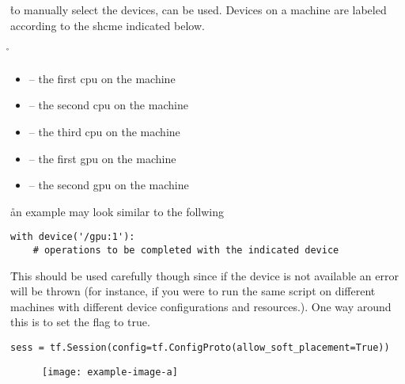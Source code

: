\r{to manually select the devices,  can be used. Devices on a machine are labeled according to the shcme indicated below.}

\r{\begin{itemize}
		\item {} -- the first cpu on the machine
		\item {} -- the second cpu on the machine
		\item {} -- the third cpu on the machine
		\item {} -- the first gpu on the machine
		\item {} -- the second gpu on the machine
\end{itemize}}

\r{an example may look similar to the follwing}

\begin{lstlisting}[style=pyInStyle]
with device('/gpu:1'):
	# operations to be completed with the indicated device
\end{lstlisting}

\r{This should be used carefully though since if the device is not available an error will be thrown (for instance, if you were to run the same script on different machines with different device configurations and resources.).  One way around this is to set the  flag to true.}

\begin{lstlisting}[style=pyInStyle]
sess = tf.Session(config=tf.ConfigProto(allow_soft_placement=True))
\end{lstlisting}



\begin{figure}[htp]
	\centering
	\texttt{[image: example-image-a]}\hfil
	\caption{}
	\label{fig:tf_api_distributed_multidevice_example}
\end{figure}



